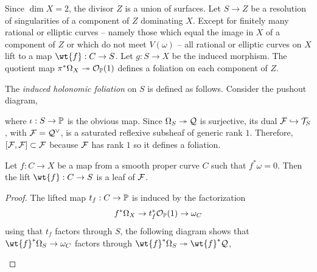 \documentclass[main.tex]{subfiles}
\begin{document}
\par 
Since $\dim{X} = 2$, the divisor $Z$ is a union of surfaces. Let $S \to Z$ be a resolution of singularities of a component of $Z$ dominating $X$. Except for finitely many rational or elliptic curves -- namely those which equal the image in $X$ of a component of $Z$ or which do not meet $V(\omega)$ -- all rational or elliptic curves on $X$ lift to a map $\wt{f} : C \to S$. Let $g : S \to X$ be the induced morphism. The quotient map $\pi^* \Omega_X \onto \cO_{\P}(1)$ defines a foliation on each component of $Z$. 

\begin{defn}
The \textit{induced holonomic foliation} on $S$ is defined as follows. Consider the pushout diagram,
\begin{center}
\end{center}
where $\iota : S \to \P$ is the obvious map. Since $\Omega_{S} \onto \cQ$ is surjective, its dual $\F \embed \T_{S}$, with $\F = \cQ^{\vee}$, is a saturated reflexive subsheaf of generic rank $1$. Therefore, $[\F, \F] \subset \F$ because $\F$ has rank $1$ so it defines a foliation.  
\end{defn}

\begin{lemma} \label{lemma:holonomic_leaf}
Let $f : C \to X$ be a map from a smooth proper curve $C$ such that $f^* \omega = 0$. Then the lift $\wt{f} : C \to S$ is a leaf of $\F$.    
\end{lemma}

\begin{proof}
The lifted map $t_f : C \to \P$ is induced by the factorization 
\[ f^* \Omega_X \to t_f^* \cO_{\P}(1) \to \omega_C \]
using that $t_f$ factors through $S$, the following diagram shows that $\wt{f}^* \Omega_{S} \to \omega_C$ factors through $\wt{f}^* \Omega_{S} \onto \wt{f}^* \cQ$,
\begin{center}
\end{center}
\end{proof}
\end{document}
